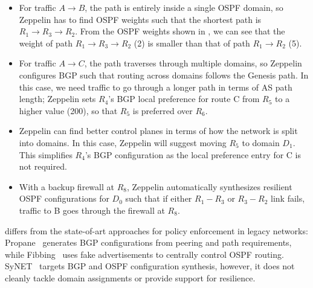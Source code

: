 \begin{itemize}
	\item
For traffic $A \rightarrow B$, the path is entirely inside
a single OSPF domain, so Zeppelin has to find OSPF weights 
such that the shortest path is $R_1 \rightarrow R_3 \rightarrow 
R_2$. From the OSPF weights shown in , 
we can see that the weight of path $R_1 
\rightarrow R_3 \rightarrow R_2$ (2) is smaller than that of path
$R_1 \rightarrow R_2$ (5). 
 	\item For traffic $A \rightarrow C$, the path traverses through 
 	multiple domains, so Zeppelin configures BGP such that 
 	routing across domains follows the Genesis path. In this case, 
 	we need traffic to go through a longer path in terms of AS path
 	length; Zeppelin sets $R_4$'s BGP local preference for route C
 	from $R_5$ to a higher value (200), so that $R_5$ is 
 	preferred over $R_6$. 
 	\item Zeppelin can find better control planes in terms of how 
 	the network is split into domains. In this case,  
 	Zeppelin will suggest moving $R_5$ to domain $D_1$. 
 	This simplifies $R_4$'s BGP configuration as the local preference 
 	entry for C is not required. 
 	\item With a backup firewall at $R_8$, 
 	Zeppelin automatically synthesizes resilient OSPF configurations
          for $D_0$ such that if either $R_1-R_3$ or $R_3-R_2$ link
          fails, traffic to B goes through the firewall at $R_8$.
\end{itemize}
\name differs from the state-of-art approaches for policy enforcement
in legacy networks: Propane~\cite{propane} generates BGP configurations
from peering and path requirements, while Fibbing~\cite{fibbing} uses fake
advertisements to centrally control OSPF routing. SyNET~\cite{synet} targets
BGP and OSPF configuration synthesis, however, it does not cleanly
tackle domain assignments or provide support for resilience.

